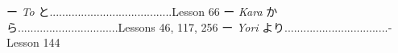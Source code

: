 \begin{itemize}
ー \emph{To }と\dothyp{}\dothyp{}\dothyp{}\dothyp{}\dothyp{}\dothyp{}\dothyp{}\dothyp{}\dothyp{}\dothyp{}\dothyp{}\dothyp{}\dothyp{}\dothyp{}\dothyp{}\dothyp{}\dothyp{}\dothyp{}\dothyp{}\dothyp{}\dothyp{}\dothyp{}\dothyp{}\dothyp{}\dothyp{}\dothyp{}\dothyp{}\dothyp{}\dothyp{}\dothyp{}\dothyp{}\dothyp{}\dothyp{}\dothyp{}\dothyp{}\dothyp{}\dothyp{}\dothyp{}\dothyp{}Lesson 66 \hfill\break
ー \emph{Kara }から\dothyp{}\dothyp{}\dothyp{}\dothyp{}\dothyp{}\dothyp{}\dothyp{}\dothyp{}\dothyp{}\dothyp{}\dothyp{}\dothyp{}\dothyp{}\dothyp{}\dothyp{}\dothyp{}\dothyp{}\dothyp{}\dothyp{}\dothyp{}\dothyp{}\dothyp{}\dothyp{}\dothyp{}\dothyp{}\dothyp{}\dothyp{}\dothyp{}\dothyp{}\dothyp{}..Lessons 46, 117, 256 \hfill\break
ー \emph{Yori }より\dothyp{}\dothyp{}\dothyp{}\dothyp{}\dothyp{}\dothyp{}\dothyp{}\dothyp{}\dothyp{}\dothyp{}\dothyp{}\dothyp{}\dothyp{}\dothyp{}\dothyp{}\dothyp{}\dothyp{}\dothyp{}\dothyp{}\dothyp{}\dothyp{}\dothyp{}\dothyp{}\dothyp{}\dothyp{}\dothyp{}\dothyp{}\dothyp{}\dothyp{}\dothyp{}\dothyp{}\dothyp{}\dothyp{}Lesson 144 \hfill\break
\hfill\break


\end{itemize}
